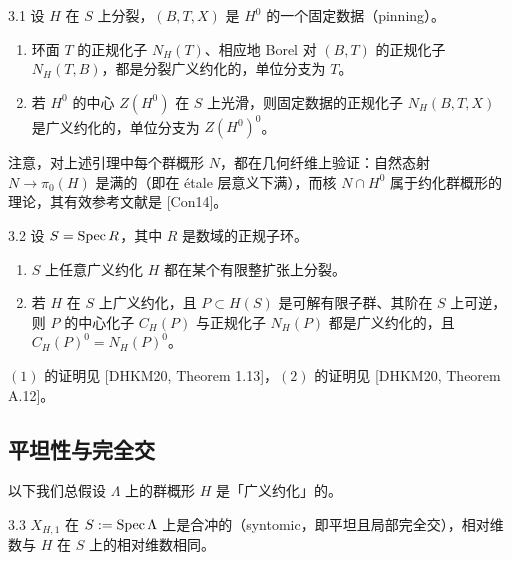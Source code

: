 \begin{lem}{3.1}
设 $H$ 在 $S$ 上分裂，$(B,T,X)$ 是 $H^0$ 的一个固定数据（pinning）。
\begin{enumerate}[label=(\arabic*),leftmargin=2.6em,itemsep=0.2em]
\item 环面 $T$ 的正规化子 $N_H(T)$、相应地 Borel 对 $(B,T)$ 的正规化子 $N_H(T,B)$，都是分裂广义约化的，单位分支为 $T$。
\item 若 $H^0$ 的中心 $Z(H^0)$ 在 $S$ 上光滑，则固定数据的正规化子 $N_H(B,T,X)$ 是广义约化的，单位分支为 $Z(H^0)^0$。
\end{enumerate}
\end{lem}

注意，对上述引理中每个群概形 $N$，都在几何纤维上验证：自然态射 $N\to\pi_0(H)$ 是满的（即在 étale 层意义下满），而核 $N\cap H^0$ 属于约化群概形的理论，其有效参考文献是 [Con14]。

\begin{lem}{3.2}
设 $S=\operatorname{Spec} R$，其中 $R$ 是数域的正规子环。
\begin{enumerate}[label=(\arabic*),leftmargin=2.6em,itemsep=0.2em]
\item $S$ 上任意广义约化 $H$ 都在某个有限整扩张上分裂。
\item 若 $H$ 在 $S$ 上广义约化，且 $P\subset H(S)$ 是可解有限子群、其阶在 $S$ 上可逆，则 $P$ 的中心化子 $C_H(P)$ 与正规化子 $N_H(P)$ 都是广义约化的，且 $C_H(P)^0=N_H(P)^0$。
\end{enumerate}
\end{lem}

$(1)$ 的证明见 [DHKM20, Theorem 1.13]，$(2)$ 的证明见 [DHKM20, Theorem A.12]。


\subsection{平坦性与完全交}

以下我们总假设 $\Lambda$ 上的群概形 $H$ 是「广义约化」的。

\begin{prop}{3.3}
$X_{H,1}$ 在 $S:=\operatorname{Spec}\Lambda$ 上是合冲的（syntomic，即平坦且局部完全交），相对维数与 $H$ 在 $S$ 上的相对维数相同。
\end{prop}

